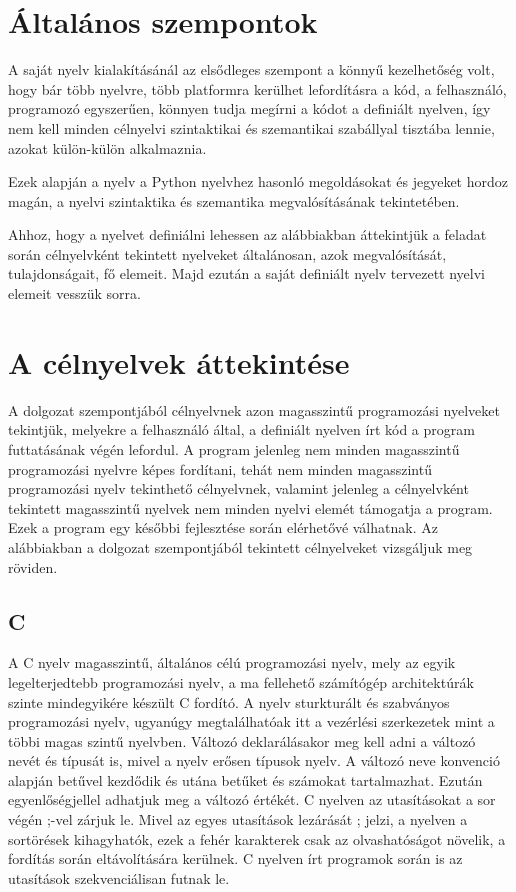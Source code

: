 
\section{Általános szempontok}

A saját nyelv kialakításánál az elsődleges szempont a könnyű kezelhetőség volt, hogy bár több nyelvre, több platformra kerülhet lefordításra a kód, a felhasználó, programozó egyszerűen, könnyen tudja megírni a kódot a definiált nyelven, így nem kell minden célnyelvi szintaktikai és szemantikai szabállyal tisztába lennie, azokat külön-külön alkalmaznia.

Ezek alapján a nyelv a Python nyelvhez hasonló megoldásokat és jegyeket hordoz magán, a nyelvi szintaktika és szemantika megvalósításának tekintetében.

Ahhoz, hogy a nyelvet definiálni lehessen az alábbiakban áttekintjük a feladat során célnyelvként tekintett nyelveket általánosan, azok megvalósítását, tulajdonságait, fő elemeit. Majd ezután a saját definiált nyelv tervezett nyelvi elemeit vesszük sorra.

\section{A célnyelvek áttekintése}

A dolgozat szempontjából célnyelvnek azon magasszintű programozási nyelveket tekintjük, melyekre a felhasználó által, a definiált nyelven írt kód a program futtatásának végén lefordul. A program jelenleg nem minden magasszintű programozási nyelvre képes fordítani, tehát nem minden magasszintű programozási nyelv tekinthető célnyelvnek, valamint jelenleg a célnyelvként tekintett magasszintű nyelvek nem minden nyelvi elemét támogatja a program. Ezek a program egy későbbi fejlesztése során elérhetővé válhatnak. Az alábbiakban a dolgozat szempontjából tekintett célnyelveket vizsgáljuk meg röviden.

\subsection{C}

A C nyelv magasszintű, általános célú programozási nyelv, mely az egyik legelterjedtebb programozási nyelv, a ma fellehető számítógép architektúrák szinte mindegyikére készült C fordító. A nyelv sturkturált és szabványos programozási nyelv, ugyanúgy megtalálhatóak itt a vezérlési szerkezetek mint a többi magas szintű nyelvben. Változó deklarálásakor meg kell adni a változó nevét és típusát is, mivel a nyelv erősen típusok nyelv. A változó neve konvenció alapján betűvel kezdődik és utána betűket és számokat tartalmazhat. Ezután egyenlőségjellel adhatjuk meg a változó értékét. C nyelven az utasításokat a sor végén ;-vel zárjuk le. Mivel az egyes utasítások lezárását ; jelzi, a nyelven a sortörések kihagyhatók, ezek a fehér karakterek csak az olvashatóságot növelik, a fordítás során eltávolítására kerülnek. C nyelven írt programok során is az utasítások szekvenciálisan futnak le.

